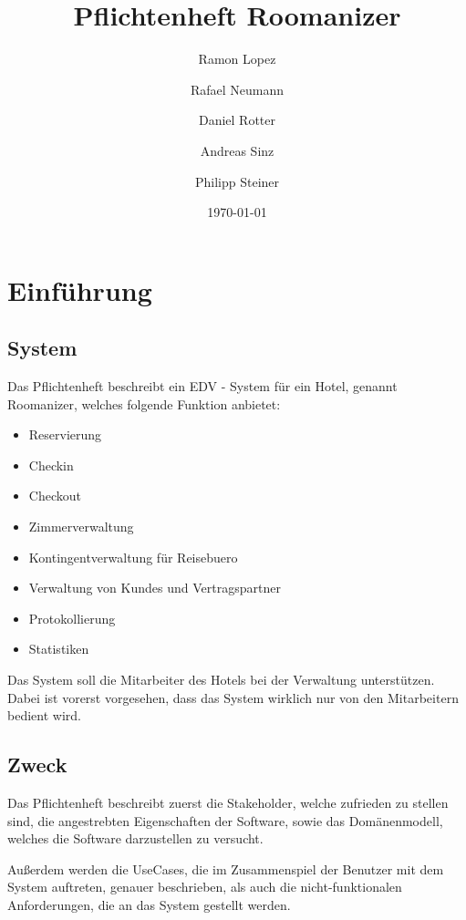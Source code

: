\documentclass[10pt,a4paper,titlepage]{article}
\begin{document}
\fancyhf{}

\lhead{\leftmark}

\setcounter{secnumdepth}{5}
\setcounter{tocdepth}{3}

\title{Pflichtenheft Roomanizer}
\author{Ramon Lopez \and Rafael Neumann \and Daniel Rotter \and Andreas Sinz \and Philipp Steiner}
\date{\today}
\maketitle

\tableofcontents
\newpage
\section{Einführung}
\subsection{System}
Das Pflichtenheft beschreibt ein EDV - System für ein Hotel, genannt Roomanizer, welches 
folgende Funktion anbietet:
\begin{itemize}
	\item \Gls{Reservierung}
	\item \Gls{Checkin}
	\item \Gls{Checkout}
	\item Zimmerverwaltung
	\item Kontingentverwaltung für \Gls{Reisebuero}
	\item Verwaltung von \Glspl{Kunde} und \Gls{Vertragspartner}
	\item Protokollierung
	\item Statistiken
\end{itemize}
Das System soll die \Gls{Mitarbeiter} des Hotels bei der Verwaltung unterstützen. Dabei ist vorerst vorgesehen, dass das System wirklich nur von den \Gls{Mitarbeiter}n bedient wird.
\subsection{Zweck}
Das Pflichtenheft beschreibt zuerst die Stakeholder, welche zufrieden zu stellen sind, die angestrebten Eigenschaften der Software, sowie das Domänenmodell, welches die Software darzustellen zu versucht. 

Außerdem werden die UseCases, die im Zusammenspiel der Benutzer mit dem System auftreten, genauer beschrieben, als auch die nicht-funktionalen Anforderungen, die an das System gestellt werden.
\end{document}
